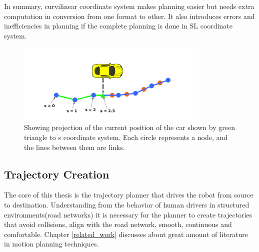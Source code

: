  In summary, curvilinear coordinate system makes planning easier but needs extra computation in conversion from one format to other. It also introduces errors and inefficiencies in planning if the complete planning is done in SL coordinate system.
 
 \begin{figure}[H]
    \centering
    \includegraphics[width=0.8\textwidth]{Images/xy_sl_conversion.png}
    \caption{Showing projection of the current position of the car shown by green triangle to s coordinate system. Each circle represents a node, and the lines between them are links.}
    \label{xy_sl_conversion}
\end{figure}


\subsection{ Trajectory Creation} \label{traj_creation}

The core of this thesis is the trajectory planner that drives the robot from source to destination. Understanding from the behavior of human drivers in structured environments(road networks) it is necessary for the planner to create trajectories that  avoid collisions, align with the road network, smooth, continuous and comfortable. Chapter \ref{related_work} discusses about great amount of literature in motion planning techniques.



